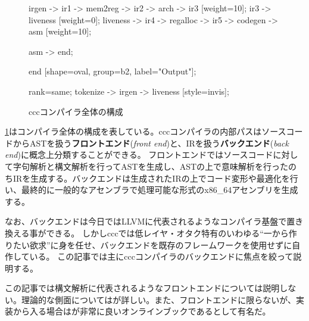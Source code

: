 \documentclass[../main.tex]{subfiles}
\begin{document}
\begin{figure}[!ht]
\begin{center}
{{        irgen -> ir1 -> mem2reg -> ir2 -> arch -> ir3  [weight=10];
        ir3 -> liveness [weight=0];
        liveness -> ir4 -> regalloc -> ir5 -> codegen -> asm [weight=10];

      }
      asm -> end;

      end [shape=oval, group=b2, label="Output"];

      { rank=same; tokenize -> irgen -> liveness [style=invis]; }
    }
    \caption{cccコンパイラ全体の構成}
    \label{ccc_arch}
  \end{center}
\end{figure}

\cref{ccc_arch}はコンパイラ全体の構成を表している。cccコンパイラの内部パスはソースコードからASTを扱う\textbf{フロントエンド}(\textit{front end})と、IRを扱う\textbf{バックエンド}(\textit{back end})に概念上分類することができる。
フロントエンドではソースコードに対して字句解析と構文解析を行ってASTを生成し、ASTの上で意味解析を行ったのちIRを生成する。バックエンドは生成されたIRの上でコード変形や最適化を行い、最終的に一般的なアセンブラで処理可能な形式のx86\_64アセンブリを生成する。

なお、バックエンドは今日ではLLVM\cite{TheLLVM}に代表されるようなコンパイラ基盤で置き換える事ができる。
しかしcccでは低レイヤ・オタク特有のいわゆる``一から作りたい欲求''に身を任せ、バックエンドを既存のフレームワークを使用せずに自作している。
この記事では主にcccコンパイラのバックエンドに焦点を絞って説明する。

この記事では構文解析に代表されるようなフロントエンドについては説明しない。理論的な側面については\cite{av2009コンパイラ}が詳しい。また、フロントエンドに限らないが、実装から入る場合は\cite{ruicompilerbook}が非常に良いオンラインブックであるとして有名だ。
\end{document}
